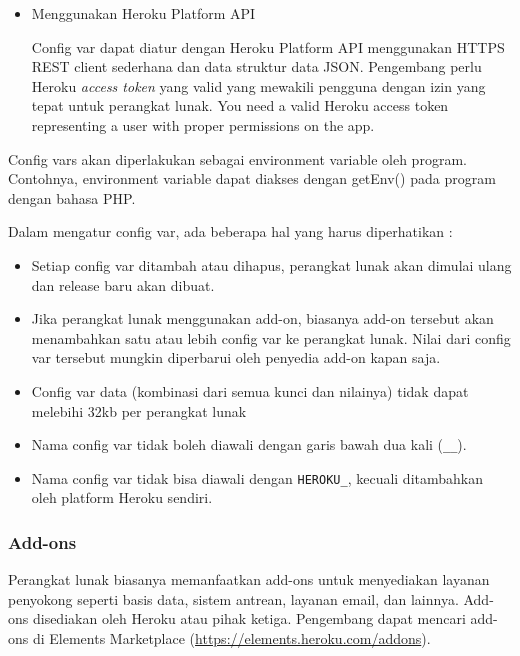 \begin{itemize}
\begin{figure}[H]
	\centering  
	\texttt{[image: bluetape-config-vars-example.png]}  
	\caption[Config vars pada dashboard Heroku]{Config vars pada dashboard Heroku} 
	\label{fig:bluetape-config-vars-example} 
\end{figure}

Config var dapat dilihat, ditambah, dan dihapus melalui menu \texttt{Settings} bagian config vars (Gambar~\ref{fig:bluetape-config-vars-example}).

\item Menggunakan Heroku Platform API

Config var dapat diatur dengan Heroku Platform API menggunakan HTTPS REST client sederhana dan data struktur data JSON. Pengembang perlu Heroku \textit{access token} yang valid yang mewakili pengguna dengan izin yang tepat untuk perangkat lunak.
You need a valid Heroku access token representing a user with proper permissions on the app.

\end{itemize}

Config vars akan diperlakukan sebagai environment variable oleh program. Contohnya, environment variable dapat diakses dengan getEnv() pada program dengan bahasa PHP.
 
Dalam mengatur config var, ada beberapa hal yang harus diperhatikan :
\begin{itemize}
\item Setiap config var ditambah atau dihapus, perangkat lunak akan dimulai ulang dan release baru akan dibuat.
\item Jika perangkat lunak menggunakan add-on, biasanya add-on tersebut akan menambahkan satu atau lebih config var ke perangkat lunak. Nilai dari config var tersebut mungkin diperbarui oleh penyedia add-on kapan saja.
\item Config var data (kombinasi dari semua kunci dan nilainya) tidak dapat melebihi 32kb per perangkat lunak
\item Nama config var tidak boleh diawali dengan garis bawah dua kali (\texttt{\_\_}).
\item Nama config var tidak bisa diawali dengan \texttt{HEROKU\_}, kecuali ditambahkan oleh platform Heroku sendiri.
\end{itemize}

\subsubsection{Add-ons}
Perangkat lunak biasanya memanfaatkan add-ons untuk menyediakan layanan penyokong seperti basis data, sistem antrean, layanan email, dan lainnya. Add-ons disediakan oleh Heroku atau pihak ketiga. Pengembang dapat mencari add-ons di Elements Marketplace (\url{https://elements.heroku.com/addons}). 

